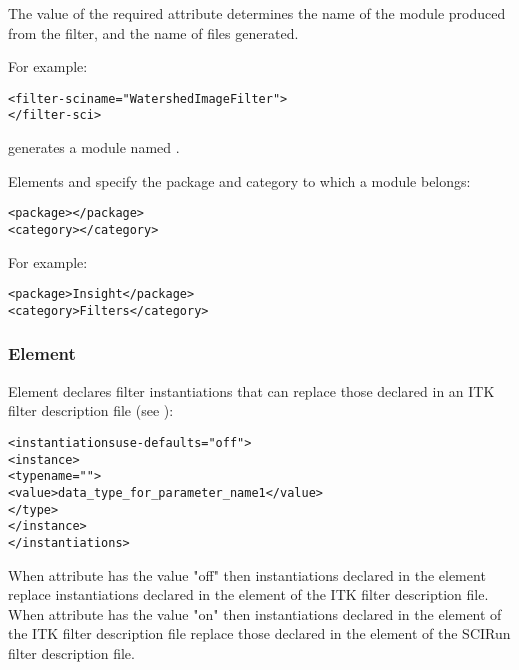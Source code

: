 The value of the required  attribute determines the name of
the \sr{} module produced from the filter, and the name of files generated. 

For example:

\begin{alltt}
  <filter-sci name="WatershedImageFilter">
  \velide
  </filter-sci>
\end{alltt}

generates a module named .

Elements  and  specify
the package and category to which a module belongs:

\begin{alltt}
  <package></package>
  <category></category>
\end{alltt}

For example:

\begin{alltt}
  <package>Insight</package>
  <category>Filters</category>
\end{alltt}

\subsubsection{Element }

Element  declares filter instantiations
that can replace those declared in an ITK filter description file (see
):

\begin{alltt}
  <instantiations use-defaults="off">
    <instance>
      <type name="">
        <value>data\_type\_for\_parameter\_name1</value>
      </type>
    </instance>
    \velide  
  </instantiations>
\end{alltt}

When attribute  has the value "off" then
instantiations declared in the  element
replace instantiations declared in the  element
of the ITK filter description file.  When attribute
 has the value "on" then instantiations
declared in the  element of the ITK filter
description file replace those declared in the
 element of the SCIRun filter description
file.

